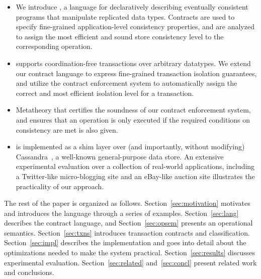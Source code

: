\begin{itemize}

\item We introduce \name, a language for declaratively describing eventually
	consistent programs that manipulate replicated data types. Contracts are used
	to specify fine-grained application-level consistency properties, and are
	analyzed to assign the most efficient and sound store consistency level to
	the corresponding operation.

\item \name supports coordination-free transactions over arbitrary datatypes.
	We extend our contract language to express fine-grained transaction isolation
	guarantees, and utilize the contract enforcement system to automatically
	assign the correct and most efficient isolation level for a transaction.

\item Metatheory that certifies the soundness of our contract enforcement
	system, and ensures that an operation is only executed if the required
	conditions on consistency are met is also given.

\item \name is implemented as a shim layer over (and importantly, without
	modifying) Cassandra~\cite{Cassandra}, a well-known general-purpose data
	store.  An extensive experimental evaluation over a collection of real-world
	applications, including a Twitter-like micro-blogging site and an eBay-like
	auction site illustrates the practicality of our approach.

\end{itemize}

The rest of the paper is organized as follows. Section~\ref{sec:motivation}
motivates \name and introduces the language through a series of examples.
Section~\ref{sec:lang} describes the contract language, and
Section~\ref{sec:opsem} presents an operational semantics.
Section~\ref{sec:txns} introduces transaction contracts and classification.
Section~\ref{sec:impl} describes the implementation and goes into detail about
the optimizations needed to make the system practical.
Section~\ref{sec:results} discusses experimental evaluation.
Section~\ref{sec:related} and~\ref{sec:concl} present related work and
conclusions.
